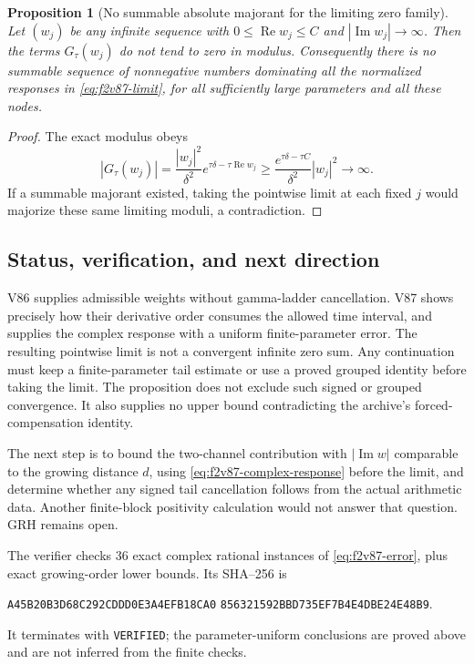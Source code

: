 \documentclass[11pt]{article}
\newtheorem{proposition}[theorem]{Proposition}
\theoremstyle{definition}
\theoremstyle{remark}
\begin{document}
\begin{proposition}[No summable absolute majorant for the limiting zero family]
\label{prop:f2v87-no-dominated-limit}
Let \((w_j)\) be any infinite sequence with
\(0\le\operatorname{Re}w_j\le C\) and \(|\operatorname{Im}w_j|\to\infty\).
Then the terms \(G_\tau(w_j)\) do not tend to zero in modulus.
Consequently there is no summable sequence of nonnegative numbers
dominating all the normalized responses in
\eqref{eq:f2v87-limit}, for all sufficiently large parameters and all
these nodes.
\end{proposition}

\begin{proof}
The exact modulus obeys
\[
 |G_\tau(w_j)|
 =\frac{|w_j|^2}{\delta^2}e^{\tau\delta-\tau\operatorname{Re}w_j}
 \ge\frac{e^{\tau\delta-\tau C}}{\delta^2}|w_j|^2\longrightarrow\infty.
\]
If a summable majorant existed, taking the pointwise limit at each
fixed \(j\) would majorize these same limiting moduli, a contradiction.
\end{proof}

\subsection*{Status, verification, and next direction}

V86 supplies admissible weights without gamma-ladder cancellation.  V87
shows precisely how their derivative order consumes the allowed time
interval, and supplies the complex response with a uniform finite-parameter
error.  The resulting pointwise limit is not a convergent infinite zero
sum.  Any continuation must keep a finite-parameter tail estimate or use
a proved grouped identity before taking the limit.  The proposition does
not exclude such signed or grouped convergence.  It also supplies no upper
bound contradicting the archive's forced-compensation identity.

The next step is to bound the two-channel contribution with
\(|\operatorname{Im}w|\) comparable to the growing distance \(d\),
using \eqref{eq:f2v87-complex-response} before the limit, and determine
whether any signed tail cancellation follows from the actual arithmetic
data.  Another finite-block positivity calculation would not answer that
question.  GRH remains open.

The verifier 
checks \(36\) exact complex rational instances of
\eqref{eq:f2v87-error}, plus exact growing-order lower bounds.  Its
SHA--256 is
\begin{center}
\texttt{A45B20B3D68C292CDDD0E3A4EFB18CA0}\allowbreak
\texttt{856321592BBD735EF7B4E4DBE24E48B9}.
\end{center}
It terminates with \texttt{VERIFIED}; the parameter-uniform conclusions
are proved above and are not inferred from the finite checks.
\end{document}
